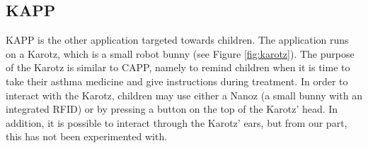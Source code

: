 \subsection{KAPP}
KAPP is the other application targeted towards children. The application runs on a Karotz\cite{karotz}, which is a small robot bunny (see Figure \ref{fig:karotz}). The purpose of the Karotz is similar to CAPP, namely to remind children when it is time to take their asthma medicine and give instructions during treatment. In order to interact with the Karotz, children may use either a Nanoz (a small bunny with an integrated RFID) or by pressing a button on the top of the Karotz' head. In addition, it is possible to interact through the Karotz' ears, but from our part, this has not been experimented with.     




